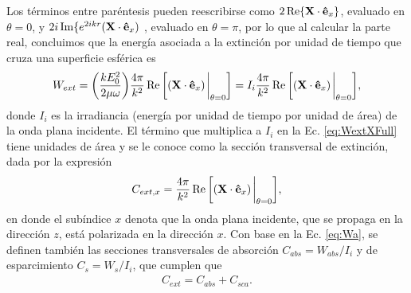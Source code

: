 %
Los términos entre paréntesis pueden reescribirse como $2\Re\{\vb{X}\cdot\vu{e}_x\}$, evaluado en $\theta = 0$, y $2i\Im\{e^{2ikr}(\vb{X}\cdot\vu{e}_x)$	, evaluado en $\theta = \pi$, por lo que al calcular la parte real, concluimos que la energía  asociada a la extinción  por unidad de tiempo que cruza una superficie esférica es
%
\begin{align}
W_{ext} = \qty(\frac{kE_0^2}{2\mu\omega})\frac{4\pi}{k^2} \Re\qty[(\vb{X}\cdot\vu{e}_x)\eval_{\theta = 0 }] = I_i \frac{4\pi}{k^2}\Re\qty[(\vb{X}\cdot\vu{e}_x)\eval_{\theta = 0 }],
\label{eq:WextXFull}
\end{align}
% 
donde $I_i$ es la irradiancia (energía por unidad de tiempo por unidad de área) de la onda plana incidente. El término que multiplica a $I_i$ en la Ec. \eqref{eq:WextXFull} tiene unidades de área y se le conoce como la sección transversal de extinción, dada por la expresión
%
\begin{align}
C_{ext,x} = \frac{4\pi}{k^2}\Re\qty[(\vb{X}\cdot\vu{e}_x)\eval_{\theta = 0 }],
\label{eq:Cextx}
\end{align}
%
en donde el subíndice $x$ denota que la onda plana incidente, que se propaga en la dirección $z$, está polarizada en la dirección $x$. Con base en la Ec. \eqref{eq:Wa}, se definen también las secciones transversales de absorción $C_{abs} = W_{abs}/I_i$ y de esparcimiento $C_s = W_s/I_i$, que cumplen que
%
\begin{align}
C_{ext} = C_{abs} + C_{sca}.
\label{eq:C_All}
\end{align}
%
	
	
	
	
	
	
	
	
	
	
	
	
	
	